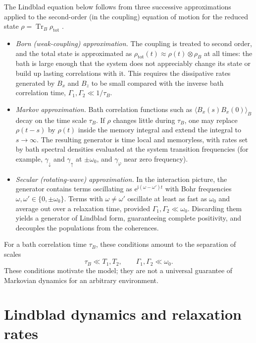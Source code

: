 \documentclass[10pt,a4paper]{article}
\newcommand{\Tr}{\operatorname{Tr}}
\newcommand{\ii}{\mathrm{i}}
\newcommand{\ee}{\mathrm{e}}
\begin{document}
The Lindblad equation below follows from three successive approximations
applied to the second-order (in the coupling) equation of motion for the
reduced state $\rho=\Tr_B\rho_{\mathrm{tot}}$ \cite{breuer}.
\begin{itemize}
 \item \emph{Born (weak-coupling) approximation.} The coupling is treated
 to second order, and the total state is approximated as
 $\rho_{\mathrm{tot}}(t)\approx\rho(t)\otimes\rho_B$ at all times: the
 bath is large enough that the system does not appreciably change its
 state or build up lasting correlations with it. This requires the
 dissipative rates generated by $B_x$ and $B_z$ to be small compared with
 the inverse bath correlation time, $\Gamma_1,\Gamma_2\ll1/\tau_B$.
 \item \emph{Markov approximation.} Bath correlation functions such as
 $\langle B_x(s)B_x(0)\rangle_B$ decay on the time scale $\tau_B$. If
 $\rho$ changes little during $\tau_B$, one may replace $\rho(t-s)$ by
 $\rho(t)$ inside the memory integral and extend the integral to
 $s\to\infty$. The resulting generator is time local and memoryless, with
 rates set by bath spectral densities evaluated at the system transition
 frequencies (for example, $\gamma_\downarrow$ and $\gamma_\uparrow$ at
 $\pm\omega_0$, and $\gamma_\varphi$ near zero frequency).
 \item \emph{Secular (rotating-wave) approximation.} In the interaction
 picture, the generator contains terms oscillating as
 $\ee^{\ii(\omega-\omega')t}$ with Bohr frequencies
 $\omega,\omega'\in\{0,\pm\omega_0\}$. Terms with $\omega\neq\omega'$
 oscillate at least as fast as $\omega_0$ and average out over a
 relaxation time, provided $\Gamma_1,\Gamma_2\ll\omega_0$. Discarding them
 yields a generator of Lindblad form, guaranteeing complete positivity,
 and decouples the populations from the coherences.
\end{itemize}
For a bath correlation time $\tau_B$, these conditions amount to the
separation of scales
\begin{equation}
 \tau_B\ll T_1,T_2,\qquad
 \Gamma_1,\Gamma_2\ll\omega_0.
 \label{eq:scales}
\end{equation}
These conditions motivate the model; they are not a universal guarantee
of Markovian dynamics for an arbitrary environment.

\section{Lindblad dynamics and relaxation rates}
\end{document}
